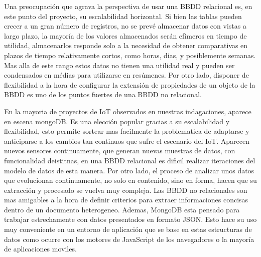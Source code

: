 Una preocupación que agrava la perspectiva de usar una BBDD relacional es, en este punto del proyecto, su escalabilidad horizontal. Si bien las tablas pueden crecer a un gran número de registros, no se prevé almacenar datos con vistas a largo plazo, la mayoría de los valores almacenados serán efímeros en tiempo de utilidad, almacenarlos responde solo a la necesidad de obtener comparativas en plazos de tiempo relativamente cortos, como horas, dias, y posiblemente semanas. Mas alla de este rango estos datos no tienen una utilidad real y pueden ser condensados en médias para utilizarse en resúmenes. Por otro lado, disponer de flexibilidad a la hora de configurar la extensión de propiedades de un objeto de la BBDD es uno de los puntos fuertes de una BBDD no relacional.

En la mayoria de proyectos de IoT observados en nuestras indagaciones, aparece en escena mongoDB. Es una elección popular gracias a su escalabilidad y flexibilidad, esto permite sortear mas facilmente la problematica de adaptarse y anticiparse a los cambios tan continuos que sufre el escenario del IoT. Aparecen nuevos sensores continuamente, que generan nuevas muestras de datos, con funcionalidad deistitnas, en una BBDD relacional es dificil realizar iteraciones del modelo de datos de esta manera. Por otro lado, el proceso de analizar unos datos que evolucionan continuamente, no solo en contenido, sino en forma, hacen que su extracción y procesado se vuelva muy compleja. Las BBDD no relacionales son mas amigables a la hora de definir criterios para extraer informaciones concisas dentro de un documento heterogeneo. Ademas, MongoDB esta pensado para trabajar estrechamente con datos presentados en formato JSON. Esto hace su uso muy conveniente en un entorno de aplicación que se base en estas estructuras de datos como ocurre con los motores de JavaScript de los navegadores o la mayoría de aplicaciones moviles.

